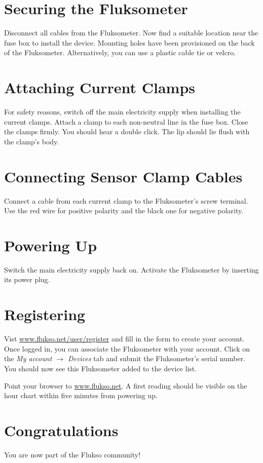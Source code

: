 \section{Securing the Fluksometer}

Disconnect all cables from the Fluksometer. Now find a suitable location near the fuse box to install the device. Mounting holes have been provisioned on the back of the Fluksometer. Alternatively, you can use a plastic cable tie or velcro.

\section{Attaching Current Clamps}

For safety reasons, switch off the main electricity supply when installing the current clamps. Attach a clamp to each non-neutral line in the fuse box. Close the clamps firmly. You should hear a double click. The lip should lie flush with the clamp's body.

\section{Connecting Sensor Clamp Cables}

Connect a cable from each current clamp to the Fluksometer's screw terminal. Use the red wire for positive polarity and the black one for negative polarity. 

\section{Powering Up}

Switch the main electricity supply back on. Activate the Fluksometer by inserting its power plug.

\section{Registering}

Vist \href{http://www.flukso.net/user/register}{www.flukso.net/user/register} and fill in the form to create your account. Once logged in, you can associate the Fluksometer with your account. Click on the \emph{My account $\rightarrow$ Devices} tab and submit the Fluksometer's serial number. You should now see this Fluksometer added to the device list.

Point your browser to \href{http://www.flukso.net}{www.flukso.net}. A first reading should be visible on the hour chart within five minutes from powering up.


\section{Congratulations}

You are now part of the Flukso community!
